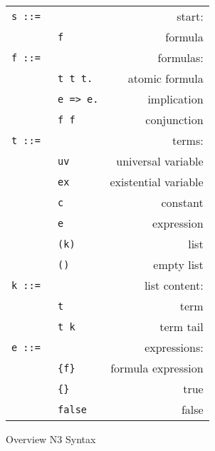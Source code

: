 \begin{figure}
\centering\small
\begin{tabular}{llr}
  \hline
  \texttt{s ::=} && start: \\
& \texttt{f}& formula\\
\texttt{f ::= } & & formulas:                 \\  
    &  \texttt{t t t.}&                atomic formula\\
    &  \texttt{e => e.}& implication\\
    &  \texttt{f f} &                 conjunction\\
 \texttt{t ::=}&&terms:                   \\
      & \texttt{uv}\hspace{0.3\textwidth} &                universal variable\\
            & \texttt{ex} &                existential variable\\
      & \texttt{c} &                constant\\
      & \texttt{e} &                 expression\\
      & \texttt{(k)}& list\\
      & \texttt{()}& empty list \\
\texttt{k ::=}&&list content: \\
&\texttt{t}& term\\
&\texttt{t k} & term tail\\
\texttt{e ::=}&&expressions:                    \\
       &\texttt{\{f\}} &               formula expression\\
       &\texttt{\{\}} & true\\
       &\texttt{false}       &               false\\
  \hline
\end{tabular}
\caption{Overview N3 Syntax \label{N3S}}
\end{figure}

